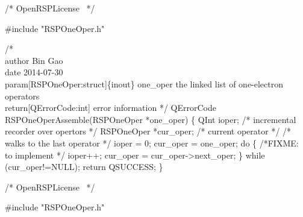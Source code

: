 \nwendcode{}\endmoddef
/*
  \LA{}OpenRSPLicense~{\nwtagstyle{}}\RA{}
*/

#include "RSPOneOper.h"

/*%
    \\author Bin Gao
    \\date 2014-07-30
    \\param[RSPOneOper:struct]\{inout\} one_oper the linked list of one-electron operators
    \\return[QErrorCode:int] error information
*/
QErrorCode RSPOneOperAssemble(RSPOneOper *one_oper)
\{
    QInt ioper;            /* incremental recorder over opertors */
    RSPOneOper *cur_oper;  /* current operator */
    /* walks to the last operator */
    ioper = 0;
    cur_oper = one_oper;
    do \{
        /*FIXME: to implement */
        ioper++;
        cur_oper = cur_oper->next_oper;
    \} while (cur_oper!=NULL);
    return QSUCCESS;
\}

\nwendcode{}\endmoddef
/*
  \LA{}OpenRSPLicense~{\nwtagstyle{}}\RA{}
*/

#include "RSPOneOper.h"

